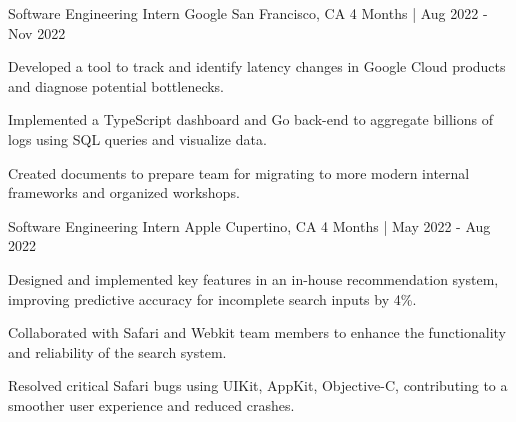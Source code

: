 \newpage
{}

\begin{cventries}
  \cvopenentry
   {Software Engineering Intern} %
    {Google} %
    {San Francisco, CA} %
    {4 Months | Aug 2022 - Nov 2022} %
    {
      \begin{cvitems} %
        \item {Developed a tool to track and identify latency changes in Google Cloud products and diagnose potential bottlenecks.}
        \item {Implemented a TypeScript dashboard and Go back-end to aggregate billions of logs using SQL queries and visualize data.}
        \item {Created documents to prepare team for migrating to more modern internal frameworks and organized workshops.}
      \end{cvitems}
    }
  \cvopenentry
   {Software Engineering Intern} %
    {Apple} %
    {Cupertino, CA} %
    {4 Months | May 2022 - Aug 2022} %
    {
      \begin{cvitems} %
        \item {Designed and implemented key features in an in-house recommendation system, improving predictive accuracy for incomplete search inputs by 4\%.}
        \item {Collaborated with Safari and Webkit team members to enhance the functionality and reliability of the search system.}
        \item {Resolved critical Safari bugs using UIKit, AppKit, Objective-C, contributing to a smoother user experience and reduced crashes.}
      \end{cvitems}
    }

\end{cventries}
